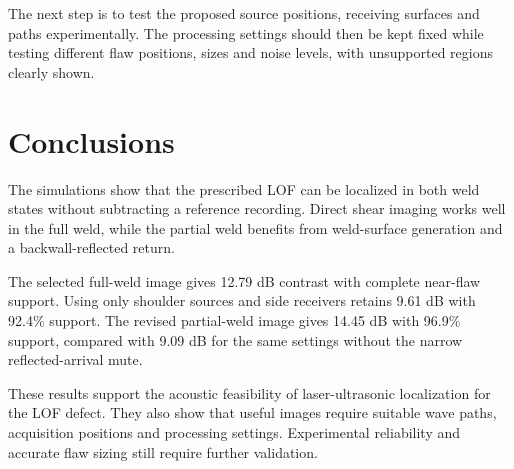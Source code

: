 The next step is to test the proposed source positions, receiving surfaces and paths experimentally. The processing settings should then be kept fixed while testing different flaw positions, sizes and noise levels, with unsupported regions clearly shown.

\section{Conclusions}
The simulations show that the prescribed LOF can be localized in both weld states without subtracting a reference recording. Direct shear imaging works well in the full weld, while the partial weld benefits from weld-surface generation and a backwall-reflected return.

The selected full-weld image gives 12.79 dB contrast with complete near-flaw support. Using only shoulder sources and side receivers retains 9.61 dB with 92.4\% support. The revised partial-weld image gives 14.45 dB with 96.9\% support, compared with 9.09 dB for the same settings without the narrow reflected-arrival mute.

These results support the acoustic feasibility of laser-ultrasonic localization for the LOF defect. They also show that useful images require suitable wave paths, acquisition positions and processing settings. Experimental reliability and accurate flaw sizing still require further validation.

\FloatBarrier
\endgroup



